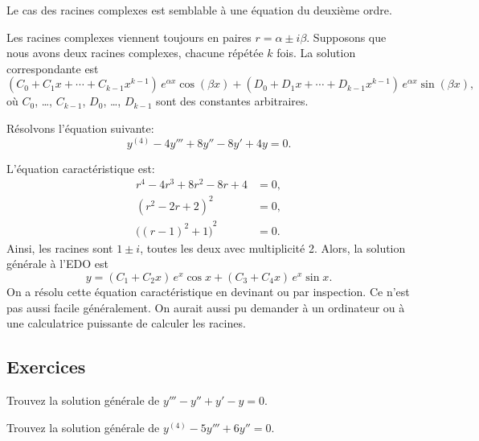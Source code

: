 Le cas des racines complexes est semblable à une équation du deuxième ordre. 

Les racines complexes viennent toujours en paires 
$r = \alpha \pm i \beta$.  Supposons que nous avons deux racines complexes, chacune répétée $k$ fois.
La solution correspondante est 
\begin{equation*}
	( C_0 + C_1 x + \cdots + C_{k-1} x^{k-1} ) \, e^{\alpha x} \cos (\beta x)
	+
	( D_0 + D_1 x + \cdots + D_{k-1} x^{k-1} ) \, e^{\alpha x} \sin (\beta x), 
\end{equation*}
où $C_0$, \ldots, $C_{k-1}$, $D_0$, \ldots, $D_{k-1}$ sont des constantes arbitraires. 

\begin{example}
	Résolvons l'équation suivante: 
	\begin{equation*}
		y^{(4)} - 4 y''' + 8 y'' - 8 y' + 4y = 0 .
	\end{equation*}
	
	L'équation caractéristique est: 
	\begin{align*}
		r^4 - 4 r^3 + 8 r^2 - 8 r + 4 & = 0 , \\
		{(r^2-2r+2)}^2 & = 0 , \\
		{\bigl({(r-1)}^2+1\bigr)}^2 & = 0 .
	\end{align*}
	Ainsi, les racines sont  $1 \pm i$, toutes les deux avec multiplicité 2. Alors, la solution générale à l'EDO est  
	\begin{equation*}
		y = ( C_1 + C_2 x ) \, e^{x} \cos x + ( C_3 + C_4 x ) \, e^{x} \sin x .
	\end{equation*}
	On a résolu cette équation caractéristique en devinant ou par inspection. Ce n'est pas aussi facile généralement. On aurait aussi pu demander à un ordinateur ou à une calculatrice puissante de calculer les racines. 
\end{example}


\subsection{Exercices}

\begin{exercise}
Trouvez la solution générale de $y''' - y'' + y' - y = 0$.
\end{exercise}

\begin{exercise}
Trouvez la solution générale de $y^{(4)} - 5 y''' + 6 y'' = 0$.
\end{exercise}

